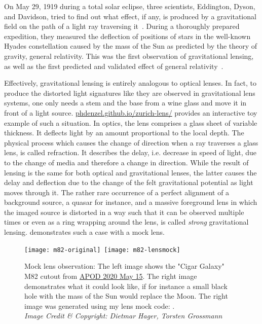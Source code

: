 
On May 29, 1919 during a total solar eclipse, three scientists, Eddington,
Dyson, and Davidson, tried to find out what effect, if any, is produced by a
gravitational field on the path of a light ray traversing
it~\cite{Eddington1920}.  During a thoroughly prepared expedition, they measured
the deflection of positions of stars in the well-known Hyades constellation
caused by the mass of the Sun as predicted by the theory of gravity, general
relativity.  This was the first observation of gravitational lensing, as well as
the first predicted and validated effect of general
relativity~\cite{Einstein1911}.

Effectively, gravitational lensing is entirely analogous to optical lenses. In
fact, to produce the distorted light signatures like they are observed in
gravitational lens systems, one only needs a stem and the base from a wine glass
and move it in front of a light source.
\href{https://phdenzel.github.io/zurich-lens/}{phdenzel.github.io/zurich-lens/}
provides an interactive toy example of such a situation.  In optics, the lens
comprises a glass sheet of variable thickness.  It deflects light by an amount
proportional to the local depth.  The physical process which causes the change
of direction when a ray traverses a glass lens, is called refraction.  It
describes the delay, i.e. decrease in speed of light, due to the change of media
and therefore a change in direction.  While the result of lensing is the same
for both optical and gravitational lenses, the latter causes the delay and
deflection due to the change of the felt gravitational potential as light moves
through it.  The rather rare occurrence of a perfect alignment of a background
source, a quasar for instance, and a massive foreground lens in which the imaged
source is distorted in a way such that it can be observed multiple times or even
as a ring wrapping around the lens, is called \textit{strong} gravitational
lensing.   demonstrates such a case with a mock lens.
%
\begin{figure}[h]%
    \centering%
    \texttt{[image: m82-original]}\,%
    \texttt{[image: m82-lensmock]}
    \caption[Mock lens image of M82]{Mock lens observation: The left image shows
      the "Cigar Galaxy" M82 cutout from
      \href{https://apod.nasa.gov/apod/ap200515.html}{APOD 2020 May 15}. The
      right image demonstrates what it could look like, if for instance a small
      black hole with the mass of the Sun would replace the Moon.  The right
      image was generated using my lens mock code: 
      \cite{lensing.js}.\\
      \textit{Image Credit \& Copyright: Dietmar Hager, Torsten
        Grossmann}}%
\end{figure}%
%

